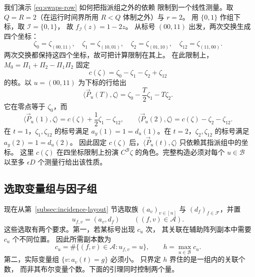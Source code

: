 \begin{remark}
我们演示 \eqref{eq:swaps-row} 如何把指派组之外的依赖
限制到一个线性测量。取 $Q=R=2$（在运行时间界所用
$R<Q$ 体制之外）与 $r=2$。
用 $\{0,1\}$ 作组下标，取 $\mathcal I=\{0,1\}$，
故 $f_{\mathcal I}(z)=1-2z$。
从标号 $(00,11)$ 出发，两次交换生成四个坐标：
\[
 \zeta_0=\zeta_{(00,11)},\quad \zeta_1=\zeta_{(10,01)},\quad
 \zeta_2=\zeta_{(01,10)},\quad \zeta_{12}=\zeta_{(11,00)}.
\]
两次交换都保持这四个坐标，故可把计算限制在其上。
在此限制上，$M_0=\Pi_1+\Pi_2-\Pi_1\Pi_2$
固定
\[
 c(\zeta)=\zeta_0-\zeta_1-\zeta_2+\zeta_{12}
\]
的核。以 $u=(00,11)$ 为下标的行给出
\[
 \langle \vec{P}_u(T), \zeta\rangle=\zeta_0-\frac T2\zeta_1-T\zeta_2.
\]
它在零点等于 $\zeta_0$，而
\[
 \langle \vec{P}_u(1), \zeta\rangle=c(\zeta)+\frac12\zeta_1-\zeta_{12},\qquad
 \langle \vec{P}_u(2), \zeta\rangle=c(\zeta)-\zeta_2-\zeta_{12}.
\]
在 $t=1$，$\zeta_1,\zeta_{12}$ 的标号满足
$a_y(1)=1=d_u(1)$。在 $t=2$，$\zeta_2,\zeta_{12}$
的标号满足 $a_y(2)=1=d_u(2)$。
因此固定 $c(\zeta)$ 后，$\langle \vec{P}_u(t), \zeta\rangle$
只依赖其指派组中的坐标。
这里 $c(\zeta)$ 在四坐标限制上扮演 $C^{\mathcal B}\zeta$
的角色。完整构造必须对每个 $u\in\mathcal B$
以至多 $\epsilon D$ 个测量行给出该性质。
\end{remark}

\subsection{选取变量组与因子组}\label{subsec:choosing-labels}
现在从第~\ref{subsec:incidence-layout} 节选取族
$(a_v)_{v\in[n]}$ 与 $(d_f)_{f\in\mathcal F}$，并置
\[
 u_{f,v}=(a_v,d_f)\qquad((f,v)\in\mathcal A).
\]
这些选取有两个要求。第一，若某标号出现 $c_u$ 次，
其关联在辅助阵列副本中需要 $c_u$ 个不同位置。
因此所需副本数为
\[
 c_u=\#\{(f,v)\in\mathcal A:u_{f,v}=u\},\qquad
 h=\max_{u\in\mathcal B}c_u.
\]
第二，实际变量组 $\{v:a_v(t)=g\}$ 必须小。
只界定 $h$ 界住的是一组内的关联个数，
而非其布尔变量个数。下面的引理同时控制两个量。

